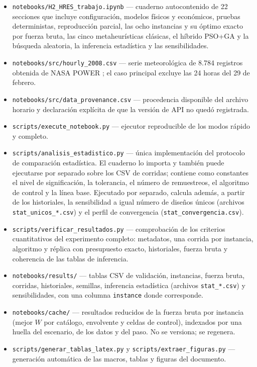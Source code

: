 \begin{itemize}
    \item \texttt{notebooks/H2\_HRES\_trabajo.ipynb} --- cuaderno autocontenido de 22 secciones que incluye configuración, modelos físicos y económicos, pruebas deterministas, reproducción parcial, las ocho instancias y su óptimo exacto por fuerza bruta, las cinco metaheurísticas clásicas, el híbrido PSO+GA y la búsqueda aleatoria, la inferencia estadística y las sensibilidades.
    \item \texttt{notebooks/src/hourly\_2008.csv} --- serie meteorológica de 8.784 registros obtenida de NASA POWER \cite{NasaPower}; el caso principal excluye las 24 horas del 29 de febrero.
    \item \texttt{notebooks/src/data\_provenance.csv} --- procedencia disponible del archivo horario y declaración explícita de que la versión de API no quedó registrada.
    \item \texttt{scripts/execute\_notebook.py} --- ejecutor reproducible de los modos rápido y completo.
    \item \texttt{scripts/analisis\_estadistico.py} --- única implementación del protocolo de comparación estadística. El cuaderno lo importa y también puede ejecutarse por separado sobre los CSV de corridas; contiene como constantes el nivel de significación, la tolerancia, el número de remuestreos, el algoritmo de control y la línea base. Ejecutado por separado, calcula además, a partir de los historiales, la sensibilidad a igual número de diseños únicos (archivos \texttt{stat\_unicos\_*.csv}) y el perfil de convergencia (\texttt{stat\_convergencia.csv}).
    \item \texttt{scripts/verificar\_resultados.py} --- comprobación de los criterios cuantitativos del experimento completo: metadatos, una corrida por instancia, algoritmo y réplica con presupuesto exacto, historiales, fuerza bruta y coherencia de las tablas de inferencia.
    \item \texttt{notebooks/results/} --- tablas CSV de validación, instancias, fuerza bruta, corridas, historiales, semillas, inferencia estadística (archivos \texttt{stat\_*.csv}) y sensibilidades, con una columna \texttt{instance} donde corresponde.
    \item \texttt{notebooks/cache/} --- resultados reducidos de la fuerza bruta por instancia (mejor $W$ por catálogo, envolvente y celdas de control), indexados por una huella del escenario, de los datos y del paso. No se versiona; se regenera.
    \item \texttt{scripts/generar\_tablas\_latex.py} y \texttt{scripts/extraer\_figuras.py} --- generación automática de las macros, tablas y figuras del documento.
\end{itemize}

